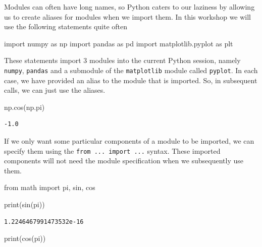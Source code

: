 \documentclass[
  letterpaper,
]{scrbook}
\newenvironment{Shaded}{\begin{snugshade}}{\end{snugshade}}
\newcommand{\BuiltInTok}[1]{#1}
\newcommand{\ImportTok}[1]{#1}
\newcommand{\NormalTok}[1]{#1}
\begin{document}
Modules can often have long names, so Python caters to our laziness by allowing us to create aliases for modules when we import them. In this workshop we will use the following statements quite often

\begin{Shaded}
\begin{Highlighting}[]
\ImportTok{import}\NormalTok{ numpy }\ImportTok{as}\NormalTok{ np}
\ImportTok{import}\NormalTok{ pandas }\ImportTok{as}\NormalTok{ pd}
\ImportTok{import}\NormalTok{ matplotlib.pyplot }\ImportTok{as}\NormalTok{ plt}
\end{Highlighting}
\end{Shaded}

These statements import 3 modules into the current Python session, namely \texttt{numpy}, \texttt{pandas} and a submodule of the \texttt{matplotlib} module called \texttt{pyplot}. In each case, we have provided an alias to the module that is imported. So, in subsequent calls, we can just use the aliases.

\begin{Shaded}
\begin{Highlighting}[]
\NormalTok{np.cos(np.pi)}
\end{Highlighting}
\end{Shaded}

\begin{verbatim}
-1.0
\end{verbatim}

If we only want some particular components of a module to be imported, we can specify them using the \texttt{from\ ...\ import\ ...} syntax. These imported components will not need the module specification when we subsequently use them.

\begin{Shaded}
\begin{Highlighting}[]
\ImportTok{from}\NormalTok{ math }\ImportTok{import}\NormalTok{ pi, sin, cos}

\BuiltInTok{print}\NormalTok{(sin(pi))}
\end{Highlighting}
\end{Shaded}

\begin{verbatim}
1.2246467991473532e-16
\end{verbatim}

\begin{Shaded}
\begin{Highlighting}[]
\BuiltInTok{print}\NormalTok{(cos(pi))}
\end{Highlighting}
\end{Shaded}
\end{document}
